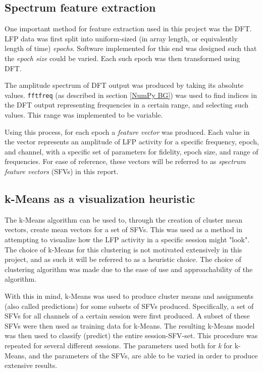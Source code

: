 \documentclass{kththesis}
\begin{document}
\subsection{Spectrum feature extraction}\label{DFT Method}

One important method for feature extraction used in this project was the DFT. 
LFP data was first split into uniform-sized (in array length, or equivalently length of time) \textit{epochs}.
Software implemented for this end was designed such that the \textit{epoch size} could be varied.
Each such epoch was then transformed using DFT.

The amplitude spectrum of DFT output was produced by taking its absolute values. 
\texttt{fftfreq} (as described in section \ref{NumPy BG}) was used to find indices in the DFT output representing frequencies in a certain range, and selecting such values.
This range was implemented to be variable.

Using this process, for each epoch a \textit{feature vector} was produced. 
Each value in the vector represents an amplitude of LFP activity for a specific frequency, epoch, and channel, with a specific set of parameters for fidelity, epoch size, and range of frequencies.
For ease of reference, these vectors will be referred to as \textit{spectrum feature vectors} (SFVs) in this report.

\subsection{k-Means as a visualization heuristic}\label{KM Method}

The k-Means algorithm can be used to, through the creation of cluster mean vectors, create mean vectors for a set of SFVs.
This was used as a method in attempting to visualize how the LFP activity in a specific session might "look".
The choice of k-Means for this clustering is not motivated extensively in this project, and as such it will be referred to as a heuristic choice.
The choice of clustering algorithm was made due to the ease of use and approachability of the algorithm.

With this in mind, k-Means was used to produce cluster means and assignments (also called predictions) for some subsets of SFVs produced.
Specifically, a set of SFVs for all channels of a certain session were first produced.
A subset of these SFVs were then used as training data for k-Means.
The resulting k-Means model was then used to classify (predict) the entire session-SFV-set.
This procedure was repeated for several different sessions.
The parameters used both for \textit{k} for k-Means, and the parameters of the SFVs, are able to be varied in order to produce extensive results. 
\end{document}
